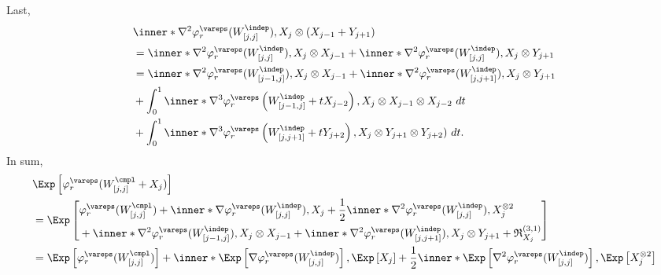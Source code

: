 \documentclass[aos]{imsart}
\begin{document}
\begin{appendix}
Last, 
\begin{equation*}
\begin{aligned}
    & \inner*{ 
        \nabla^2 \varphi_r^\vareps(W_{[j,j]}^{\indep}), 
        X_j \otimes (X_{j-1}+Y_{j+1})} \\
    & = \inner*{ 
        \nabla^2 \varphi_r^\vareps(W_{[j,j]}^{\indep}),   
        X_j \otimes X_{j-1}} 
    + \inner*{ 
        \nabla^2 \varphi_r^\vareps(W_{[j,j]}^{\indep}), 
        X_j \otimes Y_{j+1}} \\
    & = \inner*{ 
        \nabla^2 \varphi_r^\vareps(W_{[j-1,j]}^{\indep}), 
        X_j \otimes X_{j-1}}
    + \inner*{ 
        \nabla^2 \varphi_r^\vareps(W_{[j,j+1]}^{\indep}),   
        X_j \otimes Y_{j+1}} \\
    & + \int_0^1 \inner*{
        \nabla^3 \varphi_r^\vareps\left(
            W_{[j-1,j]}^{\indep} + t X_{j-2}
        \right), 
        X_j \otimes X_{j-1} \otimes X_{j-2}} ~dt \\
    & + \int_0^1 \inner*{
        \nabla^3 \varphi_r^\vareps\left(
            W_{[j,j+1]}^{\indep}+ t Y_{j+2}
        \right),
        X_j \otimes Y_{j+1} \otimes Y_{j+2})} ~dt.
\end{aligned}
\end{equation*}
In sum,
\begin{equation*}
\begin{aligned}
    & \Exp \left[
        \varphi_r^\vareps(W^\cmpl_{[j,j]} + X_j)\right] \\
    & = \Exp \left[
    \begin{aligned}
        & \varphi_r^\vareps(W^\cmpl_{[j,j]})
        + \inner*{ \nabla \varphi_r^\vareps(W_{[j,j]}^{\indep}), X_j } 
        + \frac{1}{2} 
        \inner*{\nabla^2 \varphi_r^\vareps(W_{[j,j]}^{\indep}), X_j^{\otimes 2}} \\
        & + \inner*{ 
            \nabla^2 \varphi_r^\vareps(W_{[j-1,j]}^{\indep}),  
            X_j \otimes X_{j-1}} 
        + \inner*{ 
            \nabla^2 \varphi_r^\vareps(W_{[j,j+1]}^{\indep}),
            X_j \otimes Y_{j+1}} 
        + \mathfrak{R}_{X_j}^{(3,1)}
    \end{aligned} \right] \\
    & = \Exp\left[ \varphi_r^\vareps(W^\cmpl_{[j,j]}) \right]
    + \inner*{ \Exp\left[ \nabla \varphi_r^\vareps(W_{[j,j]}^{\indep}) \right], 
        \Exp\left[ X_j \right]}
    +
        \frac{1}{2} 
        \inner*{ \Exp\left[ \nabla^2 \varphi_r^\vareps(W_{[j,j]}^{\indep}) \right], 
        \Exp\left[ X_j^{\otimes 2}\right]} \\

\end{aligned}
\end{equation*}
\end{appendix}
\end{document}
